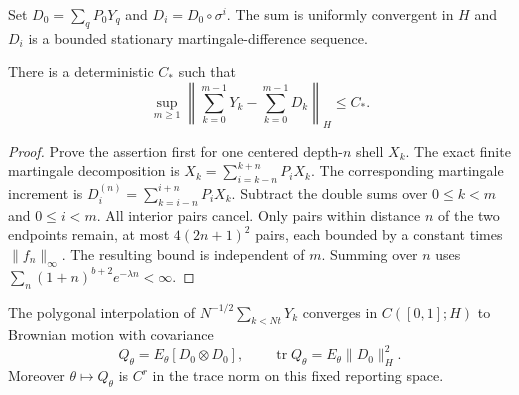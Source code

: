 Set $D_0=\sum_qP_0Y_q$ and $D_i=D_0\circ\sigma^i$. The sum is uniformly convergent in $H$ and $D_i$ is a bounded stationary martingale-difference sequence.

\begin{lemma}
\label{lem:r33-a1-remainder}
There is a deterministic $C_*$ such that
\[
 \sup_{m\ge1}\left\|\sum_{k=0}^{m-1}Y_k-
                         \sum_{k=0}^{m-1}D_k\right\|_H\le C_*.
\]
\end{lemma}

\begin{proof}
Prove the assertion first for one centered depth-$n$ shell $X_k$. The exact finite martingale decomposition is $X_k=\sum_{i=k-n}^{k+n}P_iX_k$. The corresponding martingale increment is $D_i^{(n)}=\sum_{k=i-n}^{i+n}P_iX_k$. Subtract the double sums over $0\le k<m$ and $0\le i<m$. All interior pairs cancel. Only pairs within distance $n$ of the two endpoints remain, at most $4(2n+1)^2$ pairs, each bounded by a constant times $\|f_n\|_\infty$. The resulting bound is independent of $m$. Summing over $n$ uses $\sum_n(1+n)^{b+2}e^{-\lambda n}<\infty$.
\end{proof}

\begin{theorem}
\label{thm:r33-a1-fclt}
The polygonal interpolation of $N^{-1/2}\sum_{k< Nt}Y_k$ converges in $C([0,1];H)$ to Brownian motion with covariance
\[
 Q_\theta=E_\theta[D_0\otimes D_0],\qquad
 \operatorname{tr}Q_\theta=E_\theta\|D_0\|_H^2.
\]
Moreover $\theta\mapsto Q_\theta$ is $C^r$ in the trace norm on this fixed reporting space.
\end{theorem}

